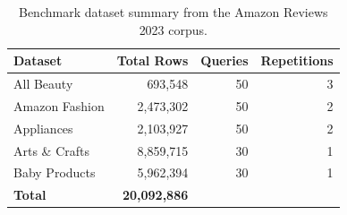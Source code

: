 \begin{table}[ht]
\centering
\begin{tabular}{lrrr}
\hline
Dataset & Total Rows & Queries & Repetitions \\
\hline
All Beauty & 693,548 & 50 & 3 \\
Amazon Fashion & 2,473,302 & 50 & 2 \\
Appliances & 2,103,927 & 50 & 2 \\
Arts \& Crafts & 8,859,715 & 30 & 1 \\
Baby Products & 5,962,394 & 30 & 1 \\
\hline
\textbf{Total} & \textbf{20,092,886} & & \\
\hline
\end{tabular}
\caption{Benchmark dataset summary from the Amazon Reviews 2023 corpus.}
\label{tab:datasets}
\end{table}